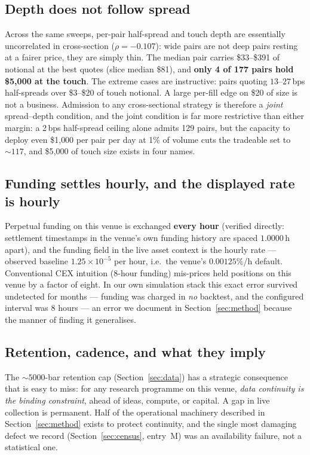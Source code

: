\documentclass[11pt,a4paper]{article}
\begin{document}
\subsection{Depth does not follow spread}
\label{sec:venue:depth}

Across the same sweeps, per-pair half-spread and touch depth are
essentially uncorrelated in cross-section ($\rho = -0.107$): wide pairs
are not deep pairs resting at a fairer price, they are simply thin. The
median pair carries \$33--\$391 of notional at the best quotes
(slice median \$81), and \textbf{only 4 of 177 pairs hold \$5{,}000 at
the touch}. The extreme cases are instructive: pairs quoting
$13$--$27$\,bps half-spreads over \$3--\$20 of touch notional. A large
per-fill edge on \$20 of size is not a business. Admission to any
cross-sectional strategy is therefore a \emph{joint} spread--depth
condition, and the joint condition is far more restrictive than either
margin: a 2\,bps half-spread ceiling alone admits 129 pairs, but the
capacity to deploy even \$1{,}000 per pair per day at 1\% of volume
cuts the tradeable set to ${\sim}117$, and \$5{,}000 of touch size
exists in four names.

\subsection{Funding settles hourly, and the displayed rate is hourly}
\label{sec:venue:funding}

Perpetual funding on this venue is exchanged \textbf{every hour}
(verified directly: settlement timestamps in the venue's own funding
history are spaced $1.0000$\,h apart), and the funding field in the
live asset context is the hourly rate --- observed baseline
$1.25\times10^{-5}$ per hour, i.e.\ the venue's $0.00125\%$/h default.
Conventional CEX intuition (8-hour funding) mis-prices held positions
on this venue by a factor of eight. In our own simulation stack this
exact error survived undetected for months --- funding was charged in
\emph{no} backtest, and the configured interval was 8 hours --- an
error we document in Section~\ref{sec:method} because the manner of
finding it generalises.

\subsection{Retention, cadence, and what they imply}

The ${\sim}5000$-bar retention cap (Section~\ref{sec:data}) has a
strategic consequence that is easy to miss: for any research programme
on this venue, \emph{data continuity is the binding constraint}, ahead
of ideas, compute, or capital. A gap in live collection is permanent.
Half of the operational machinery described in
Section~\ref{sec:method} exists to protect continuity, and the single
most damaging defect we record (Section~\ref{sec:census},
entry~M) was an availability failure, not a statistical one.
\end{document}
